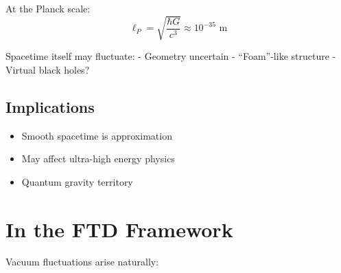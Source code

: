 \documentclass[
  11pt,
  letterpaper,
  twoside,
  openright]{book}
\providecommand{\tightlist}{%
  \setlength{\itemsep}{0pt}\setlength{\parskip}{0pt}}
\begin{document}
At the Planck scale: \[
\ell_P = \sqrt{\frac{\hbar G}{c^3}} \approx 10^{-35} \text{ m}
\]

Spacetime itself may fluctuate: - Geometry uncertain - ``Foam''-like
structure - Virtual black holes?

\subsection{Implications}\label{implications-1}

\begin{itemize}
\tightlist
\item
  Smooth spacetime is approximation
\item
  May affect ultra-high energy physics
\item
  Quantum gravity territory
\end{itemize}

\section{In the FTD Framework}\label{in-the-ftd-framework}

Vacuum fluctuations arise naturally:
\end{document}
